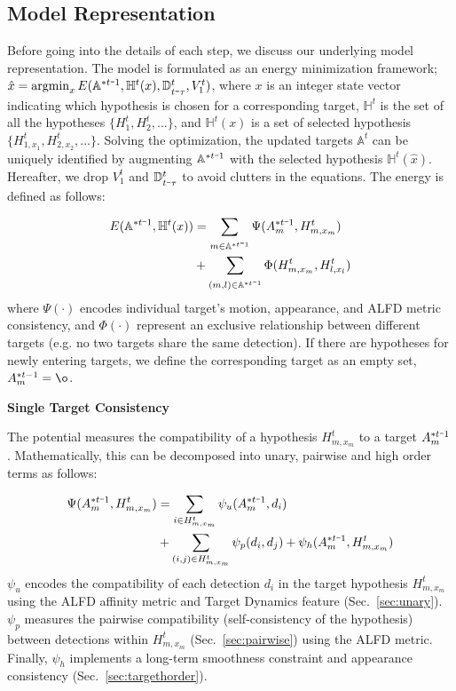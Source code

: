 \documentclass[10pt,twocolumn,letterpaper]{article}
\newcommand{\argmin}{\operatornamewithlimits{argmin}}
\newcommand{\nosection}[1]{\vspace{2mm}\noindent\textbf{#1}}
\newcommand{\minus}{\scalebox{0.5}[1.0]{$-$}}
\begin{document}
\subsection{Model Representation}
\label{sec:model}

Before going into the details of each step, we discuss our underlying model representation. The model is formulated as an energy minimization framework; $\hat{x} = \argmin_{x} E(\mathbb{A}^{* t \minus 1}, \mathbb{H}^t(x), \mathbb{D}_{t \minus \tau}^t, V_1^t)$, where $x$ is an integer state vector indicating which hypothesis is chosen for a corresponding target, 
$\mathbb{H}^t$ is the set of all the hypotheses $\{ H_1^t, H_2^t, ... \}$, and $\mathbb{H}^t(x)$ is a set of selected hypothesis $\{H_{1, x_1}^t, H_{2, x_2}^t, ... \}$. Solving the optimization, the updated targets $\mathbb{A}^t$ can be uniquely identified by augmenting $\mathbb{A}^{* t \minus 1}$ with the selected hypothesis $\mathbb{H}^t(\hat{x})$. Hereafter, we drop $V_1^t$ and $\mathbb{D}_{t \minus \tau}^t$ to avoid clutters in the equations. The energy is defined as follows:

{\footnotesize
\begin{align} 
E(\mathbb{A}^{* t \minus 1}, \mathbb{H}^t(x)) &= \sum_{m \in \mathbb{A}^{* t \minus 1}} \Psi(A_m^{* t \minus 1}, H_{m, x_m}^t) \nonumber \\
& + \sum_{ (m, l) \in \mathbb{A}^{* t \minus 1} } \Phi(H_{m, x_m}^t, H_{l, x_l}^t) \label{eq:obj}
\end{align}
}
where $\Psi( \cdot )$ encodes individual target's motion, appearance, and ALFD metric consistency, and $\Phi( \cdot )$ represent an exclusive relationship between different targets (e.g. no two targets share the same detection). If there are hypotheses for newly entering targets, we define the corresponding target as an empty set, $A_m^{* t-1} = \o$.

\nosection{Single Target Consistency}
\vspace{0.25em}

The potential measures the compatibility of a hypothesis $H_{m, x_m}^t$ to a target $A_m^{* t \minus 1}$. Mathematically, this can be decomposed into unary, pairwise and high order terms as follows:

{\scriptsize
\begin{align} 
\Psi(A_m^{* t \minus 1}, H_{m, x_m}^{t}) & = \sum_{i \in H_{m, x_m}^t} \psi_u(A_m^{* t \minus 1}, d_i) \nonumber \\
& + \sum_{(i, j) \in H_{m, x_m}^t} \psi_p(d_i, d_j) + \psi_{h}(A_m^{* t \minus 1}, H_{m, x_m}^t ) \label{eq:targetconsist}
\end{align}
}
$\psi_u$ encodes the compatibility of each detection $d_i$ in the target hypothesis $H_{m, x_m}^{t}$ using the ALFD affinity metric and Target Dynamics feature (Sec.~\ref{sec:unary}). 
$\psi_p$ measures the pairwise compatibility (self-consistency of the hypothesis) between detections within $H_{m, x_m}^{t}$ (Sec.~\ref{sec:pairwise}) using the ALFD metric. 
Finally, $\psi_{h}$ implements a long-term smoothness constraint and appearance consistency (Sec.~\ref{sec:targethorder}). 
\end{document}
